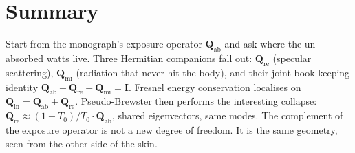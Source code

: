 \documentclass[11pt,a4paper]{article}
\theoremstyle{definition}
\newcommand{\Qabs}{\mathbf{Q}_{\mathrm{ab}}}
\newcommand{\Qref}{\mathbf{Q}_{\mathrm{re}}}
\newcommand{\Qinn}{\mathbf{Q}_{\mathrm{in}}}
\newcommand{\Qmis}{\mathbf{Q}_{\mathrm{mi}}}
\begin{document}
\section{Summary}

Start from the monograph's exposure operator $\Qabs$ and ask where
the un-absorbed watts live.  Three Hermitian companions fall out:
$\Qref$ (specular scattering), $\Qmis$ (radiation that never hit the
body), and their joint book-keeping identity $\Qabs+\Qref+\Qmis=
\mathbf{I}$.  Fresnel energy conservation localises on
$\Qinn=\Qabs+\Qref$.  Pseudo-Brewster then performs the interesting
collapse: $\Qref\approx(1-T_0)/T_0\cdot\Qabs$, shared eigenvectors,
same modes.  The complement of the exposure operator is not a new
degree of freedom.  It is the same geometry, seen from the other
side of the skin.
\end{document}
